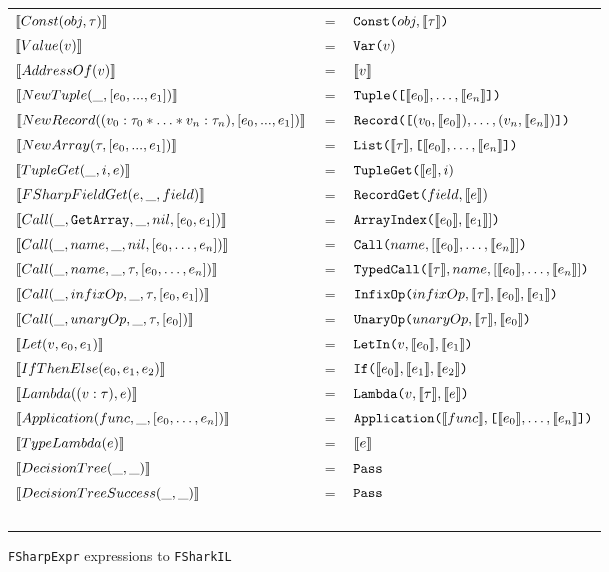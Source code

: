 \begin{figure}
  \centering
  \begin{tabular}{@{}l c l}%
  $\evals{Const(obj, \tau)}$ & $=$ & $\lit{Const(}obj, \evals{\tau} \lit{)}$ \\
  $\evals{Value(v)}$ & $=$ & $\lit{Var(}v{)}$ \\
  $\evals{AddressOf(v)}$ & $=$ & $\evals{v}$ \\
  $\evals{NewTuple(\_, [e_0,...,e_1])}$ & $=$ & $\lit{Tuple([}\evals{e_0},\ldots, \evals{e_n}\lit{])}$ \\
  $\evals{NewRecord((v_0 : \tau_0 * \ldots * v_n : \tau_n), [e_0,...,e_1])}$ & $=$ & $\lit{Record([}(v_0,\evals{e_0}),\ldots,(v_n,\evals{e_n})\lit{])}$ \\
  $\evals{NewArray(\tau, [e_0,...,e_1])}$ & $=$ & $\lit{List(}\evals{\tau},\lit{[}\evals{e_0},\ldots, \evals{e_n}\lit{]}\lit{)}$ \\
  $\evals{TupleGet(\_, i, e)}$ & $=$ & $\lit{TupleGet(}\evals{e}, i{)}$ \\
  $\evals{FSharpFieldGet(e, \_, field)}$ & $=$ & $\lit{RecordGet(}field, \evals{e}{)}$ \\
    $\evals{Call(\_, \lit{GetArray}, \_, nil, [e_0, e_1])}$ & $=$ & $\lit{ArrayIndex(}\evals{e_0},\evals{e_1}]\lit{)}$ \\
    $\evals{Call(\_, name, \_, nil, [e_0, \ldots, e_n])}$ & $=$ & $\lit{Call(}name, [\evals{e_0},\ldots,\evals{e_n}]\lit{)}$ \\
    $\evals{Call(\_, name, \_, \tau, [e_0, \ldots, e_n])}$ & $=$ & $\lit{TypedCall(}\evals{\tau},name, [\evals{e_0}, \ldots, \evals{e_n}]\lit{)}$ \\
    $\evals{Call(\_, infixOp, \_, \tau, [e_0, e_1])}$ & $=$ & $\lit{InfixOp(}infixOp, \evals{\tau}, \evals{e_0}, \evals{e_1}\lit{)}$ \\
    $\evals{Call(\_, unaryOp, \_, \tau, [e_0])}$ & $=$ & $\lit{UnaryOp(}unaryOp, \evals{\tau}, \evals{e_0}\lit{)}$ \\
  $\evals{Let(v, e_0, e_1)}$ & $=$ & $\lit{LetIn(}v, \evals{e_0}, \evals{e_1}\lit{)}$ \\
  $\evals{IfThenElse(e_0, e_1, e_2)}$ & $=$ & $\lit{If(}\evals{e_0}, \evals{e_1}, \evals{e_2}\lit{)}$ \\
  $\evals{Lambda((v : \tau), e)}$ & $=$ & $\lit{Lambda(}v, \evals{\tau}, \evals{e} \lit{)}$ \\
  $\evals{Application(func, \_, [e_0, \ldots, e_n])}$ & $=$ & $\lit{Application(}\evals{func}, \lit{[}\evals{e_0},\ldots, \evals{e_n}\lit{])}$ \\
  $\evals{TypeLambda(e)}$ & $=$ & $\evals{e}$ \\
  $\evals{DecisionTree(\_, \_)}$ & $=$ & $\lit{Pass}$ \\
  $\evals{DecisionTreeSuccess(\_, \_)}$ & $=$ & $\lit{Pass}$ \\ ~ \\
\end{tabular}
\caption{\texttt{FSharpExpr} expressions to \texttt{FSharkIL}}
\end{figure}

